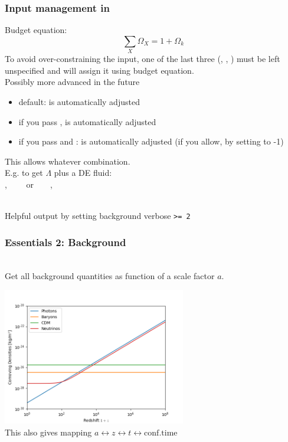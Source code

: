 \begin{frame}[fragile]
	\frametitle{Input management in {\Red \CLASS{}}}
	
	{\Red Budget equation:}
	$$
	\sum_X \Omega_X = 1 + \Omega_k
	$$
	To avoid over-constraining the input, one of the last three (, , ) must be left unspecified and  {\Red \CLASS{}} will assign it using budget equation.\\
	{\tiny Possibly more advanced in the future} 
	\begin{itemize}
		\item default:  is automatically adjusted
		\item if you pass ,    is automatically adjusted
		\item if you pass  and :  is automatically adjusted (if you allow, by setting to -1)
	\end{itemize}
	This allows whatever combination.\\
	E.g. to get $\Lambda$ plus a DE fluid: \\
	, ~~~~or~~~~, 
	
	\mbox{}\\
	Helpful output by setting background verbose \texttt{\textgreater= 2}
\end{frame}




\begin{frame}[fragile]
\frametitle{Essentials 2: Background}

\mbox{}\\
Get all background quantities as function of a scale factor $a$.


{\centering\includegraphics[width=8cm,angle=0]{Figures/background.png}}
\mbox{}\\
This also gives mapping $a \leftrightarrow z \leftrightarrow t \leftrightarrow \mathrm{conf. time}$\\

\end{frame}


